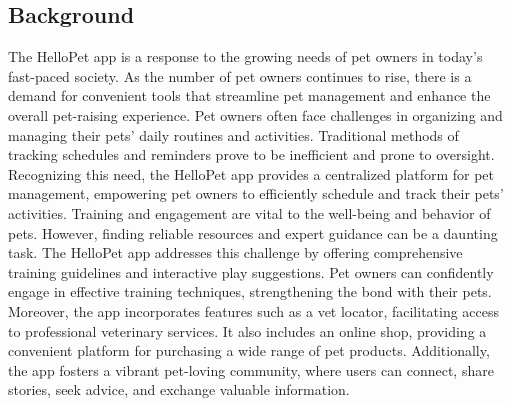\subsection{Background}
The HelloPet app is a response to the growing needs of pet owners in today's fast-paced society. As the number of pet owners continues to rise, there is a demand for convenient tools that streamline pet management and enhance the overall pet-raising experience. Pet owners often face challenges in organizing and managing their pets' daily routines and activities. Traditional methods of tracking schedules and reminders prove to be inefficient and prone to oversight. Recognizing this need, the HelloPet app provides a centralized platform for pet management, empowering pet owners to efficiently schedule and track their pets' activities. Training and engagement are vital to the well-being and behavior of pets. However, finding reliable resources and expert guidance can be a daunting task. The HelloPet app addresses this challenge by offering comprehensive training guidelines and interactive play suggestions. Pet owners can confidently engage in effective training techniques, strengthening the bond with their pets. Moreover, the app incorporates features such as a vet locator, facilitating access to professional veterinary services. It also includes an online shop, providing a convenient platform for purchasing a wide range of pet products. Additionally, the app fosters a vibrant pet-loving community, where users can connect, share stories, seek advice, and exchange valuable information. 
